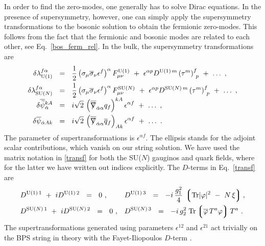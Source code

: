 \documentclass[12pt]{article}
\def\Tr{{\rm Tr}}
\newcommand{\wt}{\widetilde}
\newcommand{\ov}{\overline}
\newcommand{\lgr}{\left\lgroup}
\newcommand{\rgr}{\right\rgroup}
\def\slashed#1{\setbox0=\hbox{$#1$}             %
   \dimen0=\wd0                                 %
   \setbox1=\hbox{/} \dimen1=\wd1               %
   \ifdim\dimen0>\dimen1                        %
      \rlap{\hbox to \dimen0{\hfil/\hfil}}      %
      #1                                        %
   \else                                        %
      \rlap{\hbox to \dimen1{\hfil$#1$\hfil}}   %
      /                                         %
   \fi}                                        %
\begin{document}
	In order to find the zero-modes, one generally has to solve Dirac equations.
	In the presence of supersymmetry, however, one can simply apply the supersymmetry transformations
	to the bosonic solution to obtain the fermionic zero-modes.
	This follows from the fact that the fermionic and bosonic modes are related to each other, 
	see Eq.~\eqref{bos_ferm_rel}.
	In the bulk, the supersymmetry transformations are
\begin{align}
%
\notag
	\delta\lambda^{f\alpha}_{\rm U(1)} & ~~=~~ \frac{1}{2} \left(\sigma_\mu \ov{\sigma}{}_\nu \epsilon^f \right)^\alpha 
							        F_{\mu\nu}^{\rm U(1)}  
						~+~ \epsilon^{\alpha p} D^{{\rm U(1)}\,m} \left( \tau^m \right)^f_{\ p}
						~+~ \dots~,
\\
%
\notag
	\delta\lambda^{f\alpha}_\text{SU($N$)} & ~~=~~ \frac{1}{2} \left(\sigma_\mu \ov{\sigma}{}_\nu \epsilon^f \right)^\alpha
								F_{\mu\nu}^\text{SU($N$)}
						~+~ \epsilon^{\alpha p} D^{\text{SU($N$)}\,m} \left( \tau^m \right)^f_{\ p}
						~+~ \dots~,
\\[-0.7cm]
%
\label{transf}
\\
%
\notag
	\delta\ov{\wt{\psi}}{}_{\dot{\alpha}}^{kA} & ~~=~~ i\sqrt{2}\, 
				\left( \ov{\slashed{\nabla}}_{\dot{\alpha}\alpha} q_f \right)^{kA} \epsilon^{\alpha f} 
						~+~ \dots~,
\\
%
\notag
	\delta\ov{\psi}{}_{\dot{\alpha} A k} & ~~=~~ i\sqrt{2}\, 
				\left( \ov{\slashed{\nabla}}_{\dot{\alpha}\alpha} \ov{q}{}_f \right)_{Ak} \epsilon^{\alpha f}
						~+~ \dots ~.
\end{align}
	The parameter of supertransformations is $ \epsilon^{\alpha f} $. 
	The ellipsis stands for the adjoint scalar contributions, which vanish on our string solution. 
	We have used the matrix notation in \eqref{transf} for both the SU($N$) gauginos and quark fields, where for the latter
	we have written out indices explicitly.
	The $ D $-terms in Eq.~\eqref{transf} are
\begin{align}
%
\notag
	& D^{{\rm U(1)}\,1}  ~+~  i D^{{\rm U(1)}\,2} ~~=~~ 0~,      
	&& D^{{\rm U(1)}\,3} ~~=~~ -i\, \frac{g_1^2}{4}\, \lgr \Tr |\varphi|^2 ~-~ N\,\xi \rgr,
	\\
%
\label{dterm}
	& D^{\text{SU($N$)}\,1}  ~+~  i D^{\text{SU($N$)}\,2} ~~=~~ 0~,    
	&& D^{\text{SU($N$)}\,3} ~~=~~ -i\, g_2^2\; \Tr \lgr \ov{\varphi}\, T^a \varphi \rgr T^a~.
\end{align}
	The supertransformations generated using parameters $ \epsilon^{12} $ and $ \epsilon^{21} $ act trivially on the
	BPS string in theory with the Fayet-Iliopoulos $ D $-term \cite{VY, SYhet}.
\end{document}
